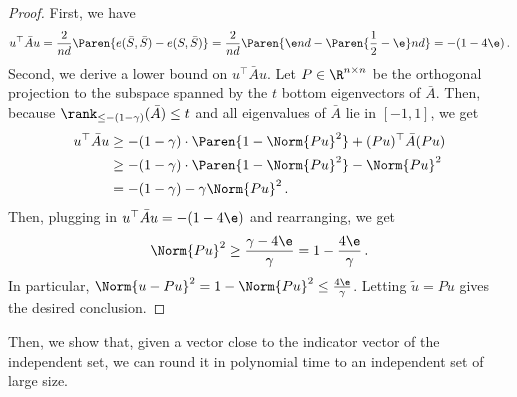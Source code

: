 
\begin{proof}
    First, we have 
    \[u^\top \bar{A} u = \frac{2}{nd} \Paren{ e(\bar{S}, \bar{S}) - e(S, \bar{S}) } = \frac{2}{nd} \Paren{\e n d - \Paren{\frac{1}{2}-\e}nd } = -(1-4\e)\,.\]
    Second, we derive a lower bound on $u^\top \bar{A} u$.
    Let $P \in \R^{n \times n}$ be the orthogonal projection to the subspace spanned by the $t$ bottom eigenvectors of $\bar{A}$.
    Then, because $\rank_{\leq -(1-\gamma)}(\bar{A}) \leq t$ and all eigenvalues of $\bar{A}$ lie in $[-1, 1]$, we get
    \begin{align*}
    u^\top \bar{A} u
    &\geq -(1-\gamma) \cdot \Paren{1-\Norm{Pu}^2} + (Pu)^\top \bar{A} (Pu)\\
    &\geq -(1-\gamma) \cdot \Paren{1-\Norm{Pu}^2} - \Norm{Pu}^2\\
    &= -(1-\gamma) - \gamma \Norm{Pu}^2\,.
    \end{align*}
    Then, plugging in $u^\top \bar{A} u = -(1-4\e)$ and rearranging, we get
    \[\Norm{Pu}^2 \geq \frac{\gamma-4\e}{\gamma} = 1 - \frac{4\e}{\gamma}\,.\]
    In particular, $\Norm{u - Pu}^2 = 1 - \Norm{Pu}^2 \leq \frac{4\e}{\gamma}$.
    Letting $\tilde{u} = Pu$ gives the desired conclusion.
\end{proof}

Then, we show that, given a vector close to the indicator vector of the independent set, we can round it in polynomial time to an independent set of large size.

